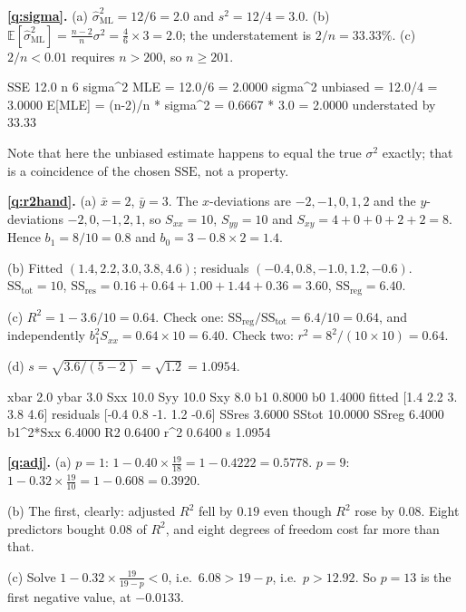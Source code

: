\documentclass[11pt]{article}
\begin{document}
\medskip
\textbf{\ref{q:sigma}.} (a) $\hat\sigma^2_{\mathrm{ML}} = 12/6 = 2.0$ and
$s^2 = 12/4 = 3.0$.
(b) $\mathbb{E}[\hat\sigma^2_{\mathrm{ML}}] = \tfrac{n-2}{n}\sigma^2
= \tfrac46 \times 3 = 2.0$; the understatement is $2/n = 33.33\%$.
(c) $2/n < 0.01$ requires $n > 200$, so $n \ge 201$.

\begin{codeout}
SSE 12.0  n 6
sigma^2 MLE      = 12.0/6 = 2.0000
sigma^2 unbiased = 12.0/4 = 3.0000
E[MLE] = (n-2)/n * sigma^2 = 0.6667 * 3.0 = 2.0000
understated by 33.33%
\end{codeout}

Note that here the unbiased estimate happens to equal the true $\sigma^2$
exactly; that is a coincidence of the chosen $\mathrm{SSE}$, not a property.

\medskip
\textbf{\ref{q:r2hand}.} (a) $\bar x = 2$, $\bar y = 3$. The $x$-deviations are
$-2,-1,0,1,2$ and the $y$-deviations $-2,0,-1,2,1$, so $S_{xx} = 10$,
$S_{yy} = 10$ and $S_{xy} = 4+0+0+2+2 = 8$. Hence $b_1 = 8/10 = 0.8$ and
$b_0 = 3 - 0.8\times2 = 1.4$.

(b) Fitted $(1.4, 2.2, 3.0, 3.8, 4.6)$; residuals $(-0.4, 0.8, -1.0, 1.2,
-0.6)$. $\mathrm{SS_{tot}} = 10$, $\mathrm{SS_{res}} = 0.16 + 0.64 + 1.00 +
1.44 + 0.36 = 3.60$, $\mathrm{SS_{reg}} = 6.40$.

(c) $R^2 = 1 - 3.6/10 = 0.64$. Check one: $\mathrm{SS_{reg}}/\mathrm{SS_{tot}}
= 6.4/10 = 0.64$, and independently $b_1^2S_{xx} = 0.64 \times 10 = 6.40$.
Check two: $r^2 = 8^2/(10 \times 10) = 0.64$.

(d) $s = \sqrt{3.6/(5-2)} = \sqrt{1.2} = 1.0954$.

\begin{codeout}
xbar 2.0 ybar 3.0  Sxx 10.0 Syy 10.0 Sxy 8.0
b1 0.8000  b0 1.4000
fitted    [1.4 2.2 3.  3.8 4.6]
residuals [-0.4  0.8 -1.   1.2 -0.6]
SSres 3.6000  SStot 10.0000  SSreg 6.4000  b1^2*Sxx 6.4000
R2 0.6400   r^2 0.6400   s 1.0954
\end{codeout}

\medskip
\textbf{\ref{q:adj}.} (a) $p = 1$:
$1 - 0.40 \times \tfrac{19}{18} = 1 - 0.4222 = 0.5778$. $p = 9$:
$1 - 0.32 \times \tfrac{19}{10} = 1 - 0.608 = 0.3920$.

(b) The first, clearly: adjusted $R^2$ fell by $0.19$ even though $R^2$ rose
by $0.08$. Eight predictors bought $0.08$ of $R^2$, and eight degrees of
freedom cost far more than that.

(c) Solve $1 - 0.32\times\tfrac{19}{19-p} < 0$, i.e.\ $6.08 > 19-p$, i.e.\
$p > 12.92$. So $p = 13$ is the first negative value, at $-0.0133$.
\end{document}
